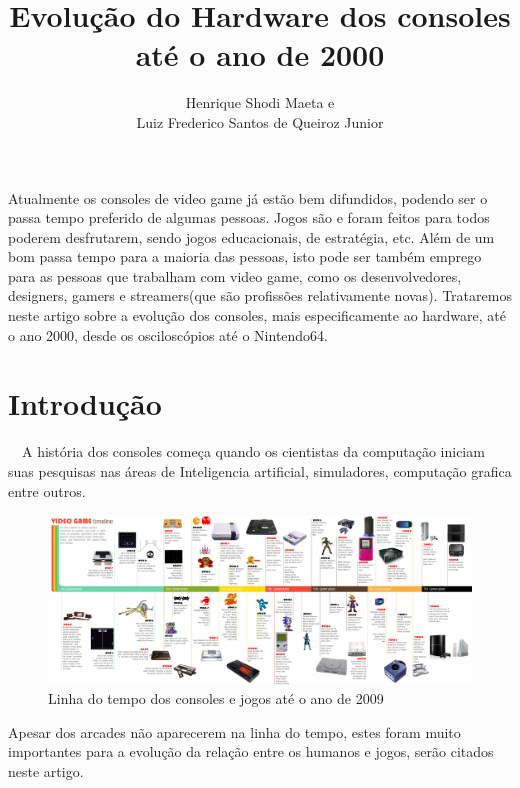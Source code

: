 \documentclass[12pt]{article}
\title{Evoluç\~{a}o do Hardware dos consoles até o ano de 2000}
\author{Henrique Shodi Maeta e \\ Luiz Frederico Santos de Queiroz Junior}
\begin{document}
 

\maketitle
     
\begin{resumo}
Atualmente os consoles de video game já est\~{a}o bem difundidos, podendo ser o passa tempo preferido de algumas pessoas. Jogos s\~{a}o e foram feitos para todos poderem desfrutarem, sendo jogos educacionais, de estratégia, etc. Além de um bom passa tempo para a maioria das pessoas, isto pode ser também emprego para as pessoas que trabalham com video game, como os desenvolvedores, designers, gamers e streamers(que s\~{a}o profiss\~{o}es relativamente novas). Trataremos neste artigo sobre a evoluç\~{a}o dos consoles, mais especificamente ao hardware, até o ano 2000, desde os osciloscópios até o Nintendo64.
\end{resumo}


\section{Introdu\c c\~{a}o}

\ \ A história dos consoles começa quando os cientistas da computaç\~{a}o iniciam suas pesquisas nas áreas de Inteligencia artificial, simuladores, computaç\~{a}o grafica entre outros.
\begin{figure}[!h]
    \centering
    \includegraphics[width= 1\textwidth]{timeline.jpg}
    \caption{Linha do tempo dos consoles e jogos até o ano de 2009}
    \label{fig:timeline}
\end{figure}

Apesar dos arcades n\~{a}o aparecerem na linha do tempo, estes foram muito importantes para a evoluç\~{a}o da relaç\~{a}o entre os humanos e jogos, ser\~{a}o citados neste artigo.
\end{document}
